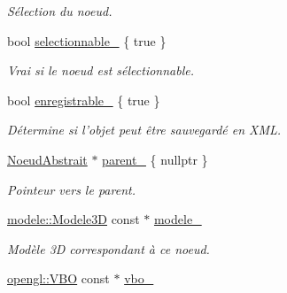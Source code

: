 \begin{DoxyCompactItemize}
\begin{DoxyCompactList}\small\item\em Sélection du noeud. \end{DoxyCompactList}\item 
\hypertarget{class_noeud_abstrait_a2e5d12f2a106f410e149263fa72a530f}{bool \hyperlink{class_noeud_abstrait_a2e5d12f2a106f410e149263fa72a530f}{selectionnable\-\_\-} \{ true \}}\label{class_noeud_abstrait_a2e5d12f2a106f410e149263fa72a530f}

\begin{DoxyCompactList}\small\item\em Vrai si le noeud est sélectionnable. \end{DoxyCompactList}\item 
\hypertarget{class_noeud_abstrait_aa4b43e83161e8650b8810c8e29f0c985}{bool \hyperlink{class_noeud_abstrait_aa4b43e83161e8650b8810c8e29f0c985}{enregistrable\-\_\-} \{ true \}}\label{class_noeud_abstrait_aa4b43e83161e8650b8810c8e29f0c985}

\begin{DoxyCompactList}\small\item\em Détermine si l'objet peut être sauvegardé en X\-M\-L. \end{DoxyCompactList}\item 
\hypertarget{class_noeud_abstrait_a002558def0146fea8c413c7928b962a1}{\hyperlink{class_noeud_abstrait}{Noeud\-Abstrait} $\ast$ \hyperlink{class_noeud_abstrait_a002558def0146fea8c413c7928b962a1}{parent\-\_\-} \{ nullptr \}}\label{class_noeud_abstrait_a002558def0146fea8c413c7928b962a1}

\begin{DoxyCompactList}\small\item\em Pointeur vers le parent. \end{DoxyCompactList}\item 
\hypertarget{class_noeud_abstrait_abc3dc8e24578214b7c6081be3246645e}{\hyperlink{classmodele_1_1_modele3_d}{modele\-::\-Modele3\-D} const $\ast$ \hyperlink{class_noeud_abstrait_abc3dc8e24578214b7c6081be3246645e}{modele\-\_\-}}\label{class_noeud_abstrait_abc3dc8e24578214b7c6081be3246645e}

\begin{DoxyCompactList}\small\item\em Modèle 3\-D correspondant à ce noeud. \end{DoxyCompactList}\item 
\hypertarget{class_noeud_abstrait_ae53668f6c4df669a0923a16b3cb84f83}{\hyperlink{classopengl_1_1_v_b_o}{opengl\-::\-V\-B\-O} const $\ast$ \hyperlink{class_noeud_abstrait_ae53668f6c4df669a0923a16b3cb84f83}{vbo\-\_\-}}\label{class_noeud_abstrait_ae53668f6c4df669a0923a16b3cb84f83}


\end{DoxyCompactItemize}
